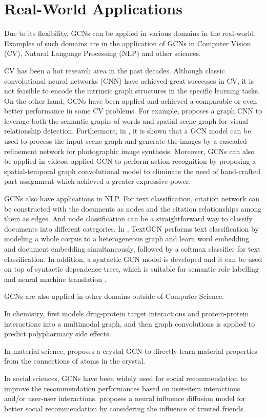 \chapter{Real-World Applications}
Due to its flexibility, GCNs can be applied in various domains in the real-world. Examples of such domains are in the application of GCNs in Computer Vision (CV), Natural Language Processing (NLP) and other sciences.

CV has been a hot research area in the past decades. Although classic convolutional neural networks (CNN) have achieved great successes in CV, it is not feasible to encode the intrinsic graph structures in the specific learning tasks. On the other hand, GCNs have been applied and achieved a comparable or even better performance in some CV problems. For example, \cite{cui2018context} proposes a graph CNN to leverage both the semantic graphs of words and spatial scene graph for visual relationship detection. Furthermore, in \cite{chen2017photographic}, it is shown that a GCN model can be used to process the input scene graph and generate the images by a cascaded refinement network for photographic image synthesis. Moreover, GCNs can also be applied in videos. \cite{yan2018spatial} applied GCN to perform action recognition by proposing a spatial-temporal graph convolutional model to eliminate the need of hand-crafted part assignment which achieved a greater expressive power.

GCNs also have applications in NLP. For text classification, citation network can be constructed with the documents as nodes and the citation relationships among them as edges. And node classification can be a straightforward way to classify documents into different categories. In \cite{yao2019graph}, TextGCN performs text classification by modeling a whole corpus to a heterogeneous graph and learn word embedding and document embedding simultaneously, followed by a softmax classifier for text classification. In addition, a syntactic GCN model is developed and it can be used on top of syntactic dependence trees, which is suitable for semantic role labelling \cite{marcheggiani2017encoding} and neural machine translation \cite{bastings2017graph}.

GCNs are also applied in other domains outside of Computer Science.

In chemistry, \cite{zitnik2018modeling} first models drug-protein target interactions and protein-protein interactions into a multimodal graph, and then graph convolutions is applied to predict polypharmacy side effects. 

In material science, \cite{xie2018crystal} proposes a crystal GCN to directly learn material properties from the connections of atoms in the crystal. 

In social sciences, GCNs have been widely used for social recommendation to improve the recommendation performances based on user-item interactions and/or user-user interactions. \cite{wu2019neural} proposes a neural influence diffusion model for better social recommendation by considering the influence of trusted friends.
